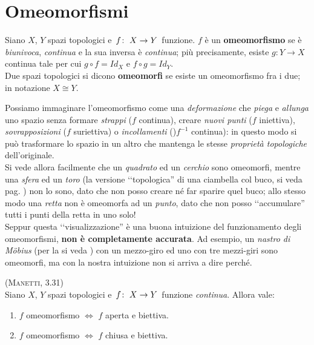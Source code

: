 \section{Omeomorfismi}
\begin{define}
Siano $X$, $Y$ spazi topologici e $\funz{f}{X}{Y}$ funzione. $f$ è un \textbf{omeomorfismo} se è \textit{biunivoca}, \textit{continua} e la sua inversa è \textit{continua}; più precisamente, esiste $g\colon Y\rightarrow X$ continua tale per cui $g\circ f = Id_{X}$ e $f\circ g = Id_{Y}$.\\
Due spazi topologici si dicono \textbf{omeomorfi} se esiste un omeomorfismo fra i due; in notazione $X\cong Y$.
\end{define}
\begin{intuit}
	Possiamo immaginare l'omeomorfismo come una \textit{deformazione} che \textit{piega} e \textit{allunga} uno spazio senza formare \textit{strappi} ($f$ continua), creare \textit{nuovi punti} ($f$ iniettiva), \textit{sovrapposizioni} ($f$ suriettiva) o \textit{incollamenti} ()$f^{-1}$ continua): in questo modo si può trasformare lo spazio in un altro che mantenga le stesse \textit{proprietà topologiche} dell'originale.\\
	Si vede allora facilmente che un \textit{quadrato} ed un \textit{cerchio} sono omeomorfi, mentre una \textit{sfera} ed un \textit{toro} (la versione ‘‘topologica'' di una ciambella col buco, si veda pag. \pageref{cambiella}) non lo sono, dato che non posso creare né far sparire quel buco; allo stesso modo una \textit{retta} non è omeomorfa ad un \textit{punto}, dato che non posso ‘‘accumulare'' tutti i punti della retta in uno solo!\\
	Seppur questa ‘‘visualizzazione'' è una buona intuizione del funzionamento degli omeomorfismi, \textbf{non è completamente accurata}. Ad esempio, un \textit{nastro di Möbius} (per la si veda \pageref{nastromobius}) con un mezzo-giro ed uno con tre mezzi-giri sono omeomorfi, ma con la nostra intuizione non si arriva a dire perché.
\end{intuit}
\begin{lemming}\textsc{(Manetti, 3.31)}\\
Siano $X$, $Y$ spazi topologici e $\funz{f}{X}{Y}$ funzione \textit{continua}. Allora vale:
\begin{enumerate}
\item $f$ omeomorfismo $\iff$ $f$ aperta e biettiva.
\item $f$ omeomorfismo $\iff$ $f$ chiusa e biettiva.
\end{enumerate}
\end{lemming}
